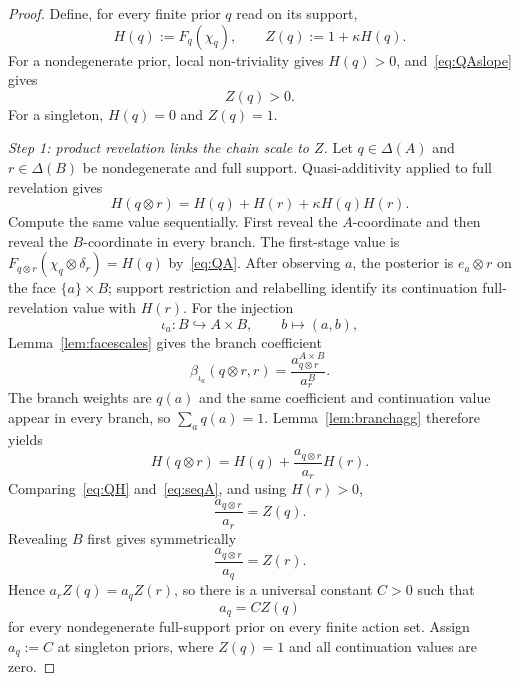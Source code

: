 \documentclass[11pt,a4paper]{article}
\theoremstyle{definition}
\newcommand{\1}{\mathbf 1}
\begin{document}
\begin{proof}
Define, for every finite prior $q$ read on its support,
\[
H(q):=F_q(\chi_q),
\qquad
Z(q):=1+\kappa H(q).
\]
For a nondegenerate prior, local non-triviality gives $H(q)>0$, and~\eqref{eq:QAslope} gives
\begin{equation}
Z(q)>0.
\tag{Z+}\label{eq:Zpositive}
\end{equation}
For a singleton, $H(q)=0$ and $Z(q)=1$.

\emph{Step 1: product revelation links the chain scale to $Z$.}
Let $q\in\Delta(A)$ and $r\in\Delta(B)$ be nondegenerate and full support.  Quasi-additivity applied to full revelation
gives
\begin{equation}
H(q\otimes r)=H(q)+H(r)+\kappa H(q)H(r).
\tag{QH}\label{eq:QH}
\end{equation}
Compute the same value sequentially.  First reveal the $A$-coordinate and then reveal the $B$-coordinate in every branch.
The first-stage value is $F_{q\otimes r}(\chi_q\otimes\delta_r)=H(q)$ by~\eqref{eq:QA}.  After observing $a$, the
posterior is $e_a\otimes r$ on the face $\{a\}\times B$; support restriction and relabelling identify its continuation
full-revelation value with $H(r)$.  For the injection
\[
\iota_a:B\hookrightarrow A\times B,\qquad b\mapsto(a,b),
\]
Lemma~\ref{lem:facescales} gives the branch coefficient
\[
\beta_{\iota_a}(q\otimes r,r)=\frac{a^{A\times B}_{q\otimes r}}{a^B_r}.
\]
The branch weights are $q(a)$ and the same coefficient and continuation value appear in every branch, so
$\sum_a q(a)=1$.  Lemma~\ref{lem:branchagg} therefore yields
\begin{equation}
H(q\otimes r)=H(q)+\frac{a_{q\otimes r}}{a_r}H(r).
\tag{SA}\label{eq:seqA}
\end{equation}
Comparing~\eqref{eq:QH} and~\eqref{eq:seqA}, and using $H(r)>0$,
\begin{equation}
\frac{a_{q\otimes r}}{a_r}=Z(q).
\tag{R1}\label{eq:ratio1}
\end{equation}
Revealing $B$ first gives symmetrically
\begin{equation}
\frac{a_{q\otimes r}}{a_q}=Z(r).
\tag{R2}\label{eq:ratio2}
\end{equation}
Hence $a_rZ(q)=a_qZ(r)$, so there is a universal constant $C>0$ such that
\begin{equation}
a_q=CZ(q)
\tag{AS}\label{eq:ascaleZ}
\end{equation}
for every nondegenerate full-support prior on every finite action set.  Assign $a_q:=C$ at singleton priors, where
$Z(q)=1$ and all continuation values are zero.


\end{proof}
\end{document}

